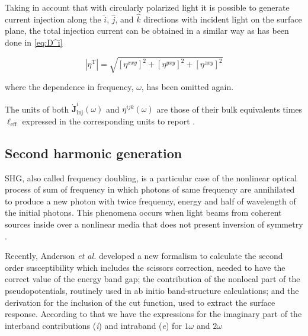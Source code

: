 \documentclass[aps,pra,11pt,tightenlines,showpacs,superscriptaddress,groupedaddress]{revtex4-1}
\begin{document}
Taking in account that with circularly polarized light it is possible to generate current injection along the $\hat{i}$, $\hat{j}$, and $\hat{k}$ directions with incident light on the surface plane, the total injection current can be obtained in a similar way as has been done in \ref{eq:D^i}

\begin{equation*}
    |{\eta^{\text{T}}}| = \sqrt{ \left[ \eta^{xxy} \right]^{2} + \left[ \eta^{yxy} \right]^{2} + \left[ \eta^{zxy} \right]^{2} }
\end{equation*}

\noindent where the dependence in frequency, $\omega$, has been omitted again.

The units of both $\mathbf{\dot{J}}^{i}_{\text{inj}}(\omega)$ and $\eta^{ijk} (\omega)$  are those of their bulk equivalents times $\ell_{\text{eff}}$ expressed in the corresponding units to report \cite{cabellos2011optical}.



    \subsection{Second harmonic generation}

SHG, also called frequency doubling, is a particular case of the nonlinear optical process of sum of frequency in which photons of same frequency are annihilated to produce a new photon with twice frequency, energy and half of wavelength of the initial photons. This phenomena occurs when light beams from coherent sources inside over a nonlinear media that does not present inversion of symmetry \cite{bloembergen1962light,anderson2015theory,salazar2014molecular,sipe2000second}.

Recently, Anderson \emph{et al.} \cite{anderson2015theory} developed a new formalism to calculate the second order susceptibility which includes the scissors correction, needed to have the correct value of the energy band gap; the contribution of the nonlocal part of the pseudopotentials, routinely used in ab initio band-structure calculations; and the derivation for the inclusion of the cut function, used to extract the surface response. According to that we have the expressions for the imaginary part of the interband contributions (\emph{i}) and intraband (\emph{e}) for $1\omega$ and $2\omega$
\end{document}
